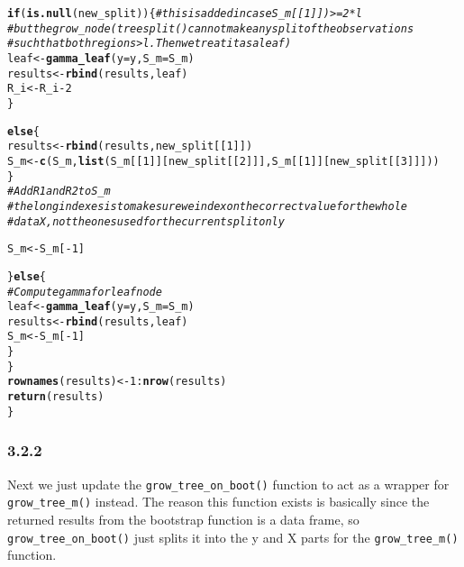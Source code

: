\documentclass[10pt, a4paper, english]{article}\usepackage[]{graphicx}\usepackage[dvipsnames]{xcolor}
\makeatletter
\newcommand{\hlnum}[1]{\textcolor[rgb]{0.686,0.059,0.569}{#1}}%
\newcommand{\hlcom}[1]{\textcolor[rgb]{0.678,0.584,0.686}{\textit{#1}}}%
\newcommand{\hlopt}[1]{\textcolor[rgb]{0,0,0}{#1}}%
\newcommand{\hlstd}[1]{\textcolor[rgb]{0.345,0.345,0.345}{#1}}%
\newcommand{\hlkwa}[1]{\textcolor[rgb]{0.161,0.373,0.58}{\textbf{#1}}}%
\newcommand{\hlkwb}[1]{\textcolor[rgb]{0.69,0.353,0.396}{#1}}%
\newcommand{\hlkwc}[1]{\textcolor[rgb]{0.333,0.667,0.333}{#1}}%
\newcommand{\hlkwd}[1]{\textcolor[rgb]{0.737,0.353,0.396}{\textbf{#1}}}%
\newenvironment{kframe}{%
 \def\at@end@of@kframe{}%
 \ifinner\ifhmode%
  \def\at@end@of@kframe{\end{minipage}}%
  \begin{minipage}{\columnwidth}%
 \fi\fi%
 \def\FrameCommand##1{\hskip\@totalleftmargin \hskip-\fboxsep
 \colorbox{shadecolor}{##1}\hskip-\fboxsep
     \hskip-\linewidth \hskip-\@totalleftmargin \hskip\columnwidth}%
 \MakeFramed {\advance\hsize-\width
   \@totalleftmargin\z@ \linewidth\hsize
   \@setminipage}}%
 {\par\unskip\endMakeFramed%
 \at@end@of@kframe}
\newenvironment{knitrout}{}{} %
\makeatother
\begin{document}
\begin{knitrout}
\begin{kframe}
\begin{alltt}
    \hlkwa{if}\hlstd{(}\hlkwd{is.null}\hlstd{(new_split))\{} \hlcom{#this is added in case S_m[[1]]) >= 2 * l}
     \hlcom{# but the grow_node (tree split() cannot make any split of the observations }
     \hlcom{# such that both regions > l. Then we treat it as a leaf)}
    \hlstd{leaf} \hlkwb{<-} \hlkwd{gamma_leaf}\hlstd{(}\hlkwc{y}\hlstd{=y,} \hlkwc{S_m} \hlstd{= S_m)}
    \hlstd{results} \hlkwb{<-} \hlkwd{rbind}\hlstd{(results, leaf)}
    \hlstd{R_i} \hlkwb{<-} \hlstd{R_i} \hlopt{-} \hlnum{2}
    \hlstd{\}}

    \hlkwa{else}\hlstd{\{}
       \hlstd{results} \hlkwb{<-} \hlkwd{rbind}\hlstd{(results,new_split[[}\hlnum{1}\hlstd{]])}
         \hlstd{S_m} \hlkwb{<-} \hlkwd{c}\hlstd{(S_m,} \hlkwd{list}\hlstd{(S_m[[}\hlnum{1}\hlstd{]][new_split[[}\hlnum{2}\hlstd{]]], S_m[[}\hlnum{1}\hlstd{]][new_split[[}\hlnum{3}\hlstd{]]]))}
    \hlstd{\}}
  \hlcom{# Add R1 and R2 to S_m}
    \hlcom{#the long indexes is to make sure we index on the correct value for the whole}
   \hlcom{#data X, not the ones used for the current split only}

    \hlstd{S_m} \hlkwb{<-} \hlstd{S_m[}\hlopt{-}\hlnum{1}\hlstd{]}


    \hlstd{\}} \hlkwa{else} \hlstd{\{}
    \hlcom{# Compute gamma for leaf node}
    \hlstd{leaf} \hlkwb{<-} \hlkwd{gamma_leaf}\hlstd{(}\hlkwc{y}\hlstd{=y,} \hlkwc{S_m} \hlstd{= S_m)}
    \hlstd{results} \hlkwb{<-} \hlkwd{rbind}\hlstd{(results, leaf)}
    \hlstd{S_m} \hlkwb{<-} \hlstd{S_m[}\hlopt{-}\hlnum{1}\hlstd{]}
    \hlstd{\}}
  \hlstd{\}}
  \hlkwd{rownames}\hlstd{(results)} \hlkwb{<-} \hlnum{1}\hlopt{:}\hlkwd{nrow}\hlstd{(results)}
  \hlkwd{return}\hlstd{(results)}
\hlstd{\}}
\end{alltt}
\end{kframe}
\end{knitrout}

\subsubsection{3.2.2}
Next we just update the \texttt{grow\_tree\_on\_boot()} function to act as a wrapper for \texttt{ grow\_tree\_m()} instead. The reason this function exists is basically since the returned results from the bootstrap function is a data frame, so \texttt{grow\_tree\_on\_boot()} just splits it into the y and X parts for the \texttt{grow\_tree\_m()} function. 
\end{document}
